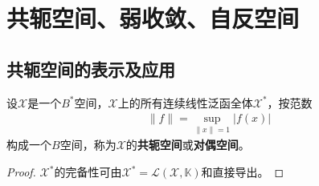 \documentclass[../../main.tex]{subfiles}%
\begin{document}
\section{共轭空间、弱收敛、自反空间}

\subsection{共轭空间的表示及应用}

\begin{theorem}\label{theorem:共轭空间的完备性}
设$\mathscr{X}$是一个$B^*$空间，$\mathscr{X}$上的所有连续线性泛函全体$\mathscr{X}^*$，按范数
\begin{align*}
\|f\|=\sup\limits_{\|x\|=1}|f(x)|
\end{align*}
构成一个$B$空间，称为$\mathscr{X}$的\textbf{共轭空间}或\textbf{对偶空间}。
\end{theorem}
\begin{proof}

$\mathscr{X}^*$的完备性可由$\mathscr{X}^*=\mathscr{L}(\mathscr{X},\mathbb{K})$和直接导出。
\end{proof}
\end{document}
